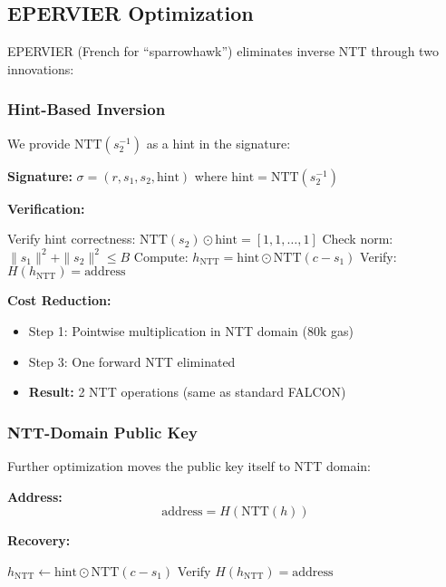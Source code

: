 \documentclass[11pt,a4paper]{article}
\begin{document}
\subsection{EPERVIER Optimization}

EPERVIER (French for ``sparrowhawk'') eliminates inverse NTT through two innovations:

\subsubsection{Hint-Based Inversion}

We provide $\text{NTT}(s_2^{-1})$ as a hint in the signature:

\textbf{Signature:} $\sigma = (r, s_1, s_2, \text{hint})$ where $\text{hint} = \text{NTT}(s_2^{-1})$

\textbf{Verification:}
\begin{algorithmic}[1]
\STATE Verify hint correctness: $\text{NTT}(s_2) \odot \text{hint} = [1, 1, \ldots, 1]$
\STATE Check norm: $\|s_1\|^2 + \|s_2\|^2 \leq B$
\STATE Compute: $h_{\text{NTT}} = \text{hint} \odot \text{NTT}(c - s_1)$
\STATE Verify: $H(h_{\text{NTT}}) = \text{address}$
\end{algorithmic}

\textbf{Cost Reduction:}
\begin{itemize}
    \item Step 1: Pointwise multiplication in NTT domain (80k gas)
    \item Step 3: One forward NTT eliminated
    \item \textbf{Result:} 2 NTT operations (same as standard FALCON)
\end{itemize}

\subsubsection{NTT-Domain Public Key}

Further optimization moves the public key itself to NTT domain:

\textbf{Address:}
\begin{equation}
\text{address} = H(\text{NTT}(h))
\end{equation}

\textbf{Recovery:}
\begin{algorithmic}[1]
\STATE $h_{\text{NTT}} \gets \text{hint} \odot \text{NTT}(c - s_1)$
\STATE Verify $H(h_{\text{NTT}}) = \text{address}$
\end{algorithmic}
\end{document}
